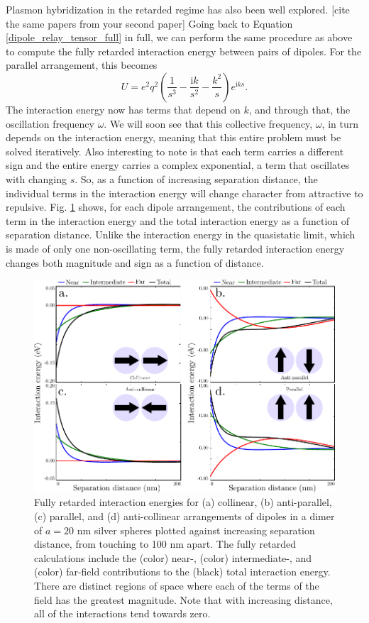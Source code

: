 \documentclass [11pt, proquest] {uwthesis}[2016/11/22]
\begin{document}
Plasmon hybridization in the retarded regime has also been well explored. [cite the same papers from your second paper] Going back to Equation \ref{dipole_relay_tensor_full} in full, we can perform the same procedure as above to compute the fully retarded interaction energy between pairs of dipoles. For the parallel arrangement, this becomes
\begin{equation}
U = e^2q^2\left(\frac{1}{s^3}-\frac{\textrm{i}k}{s^2}-\frac{k^2}{s}\right)e^{\textrm{i}ks}.
\label{int_ret}
\end{equation}
The interaction energy now has terms that depend on $k$, and through that, the oscillation frequency $\omega$. We will soon see that this collective frequency, $\omega$, in turn depends on the interaction energy, meaning that this entire problem must be solved iteratively. Also interesting to note is that each term carries a different sign and the entire energy carries a complex exponential, a term that oscillates with changing $s$. So, as a function of increasing separation distance, the individual terms in the interaction energy will change character from attractive to repulsive. Fig. \ref{dimer_ret} shows, for each dipole arrangement, the contributions of each term in the interaction energy and the total interaction energy as a function of separation distance. Unlike the interaction energy in the quasistatic limit, which is made of only one non-oscillating term, the fully retarded interaction energy changes both magnitude and sign as a function of distance.

\begin{figure}
\begin{centering}
\includegraphics{dimer_ret.pdf}
\caption{Fully retarded interaction energies for (a) collinear, (b) anti-parallel, (c) parallel, and (d) anti-collinear arrangements of dipoles in a dimer of $a=20$ nm silver spheres plotted against increasing separation distance, from touching to 100 nm apart. The fully retarded calculations include the (color) near-, (color) intermediate-, and (color) far-field contributions to the (black) total interaction energy. There are distinct regions of space where each of the terms of the field has the greatest magnitude. Note that with increasing distance, all of the interactions tend towards zero.}
\label{dimer_ret}
\end{centering}
\end{figure}
\end{document}
